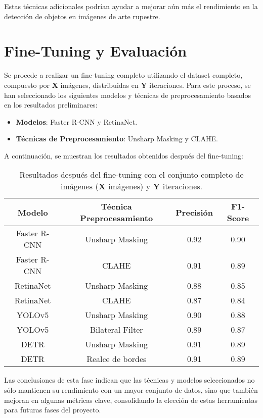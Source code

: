 Estas técnicas adicionales podrían ayudar a mejorar aún más el rendimiento en la detección de objetos en imágenes de arte rupestre.

\section{Fine-Tuning y Evaluación}
Se procede a realizar un fine-tuning completo utilizando el dataset completo, compuesto por \textbf{X} imágenes, distribuidas en \textbf{Y} iteraciones.
Para este proceso, se han seleccionado los siguientes modelos y técnicas de preprocesamiento basados en los resultados preliminares:

\begin{itemize}
    \item \textbf{Modelos}: Faster R-CNN y RetinaNet.
    \item \textbf{Técnicas de Preprocesamiento}: Unsharp Masking y CLAHE.
\end{itemize}

A continuación, se muestran los resultados obtenidos después del fine-tuning:

\begin{table}[htbp]
    \centering
    \begin{tabular}{|c|c|c|c|}
        \hline
        Modelo & Técnica Preprocesamiento & Precisión & F1-Score \\ \hline
        Faster R-CNN & Unsharp Masking & 0.92 & 0.90 \\ \hline
        Faster R-CNN & CLAHE & 0.91 & 0.89 \\ \hline
        RetinaNet & Unsharp Masking & 0.88 & 0.85 \\ \hline
        RetinaNet & CLAHE & 0.87 & 0.84 \\ \hline
        YOLOv5 & Unsharp Masking & 0.90 & 0.88 \\ \hline
        YOLOv5 & Bilateral Filter & 0.89 & 0.87 \\ \hline
        DETR & Unsharp Masking & 0.91 & 0.89 \\ \hline
        DETR & Realce de bordes & 0.91 & 0.89 \\ \hline
    \end{tabular}
    \caption{Resultados después del fine-tuning con el conjunto completo de imágenes (\textbf{X} imágenes) y \textbf{Y} iteraciones.}
    \label{tab:resultados_fine_tuning}
\end{table}

Las conclusiones de esta fase indican que las técnicas y modelos seleccionados no sólo mantienen su rendimiento con un mayor conjunto de datos, sino que también mejoran en algunas métricas clave, consolidando la elección de estas herramientas para futuras fases del proyecto.


